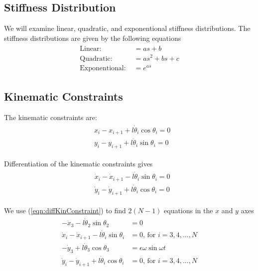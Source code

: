 \documentclass[12pt,letterpaper,titlepage]{article}
\begin{document}
\subsection{Stiffness Distribution}
We will examine linear, quadratic, and exponentional stiffness distributions. The stiffness distributions are given by the following equations
\begin{align}
\begin{split}
\text{Linear: } &= as + b \\
\text{Quadratic: } &= as^2 + bs + c \\
\text{Exponentional: } &= e^{as}
\end{split}
\end{align}

\subsection{Kinematic Constraints}
The kinematic constraints are:
\begin{align}
\begin{split}
& {x}_i - {x}_{i+1} + l \dot{\theta}_i \cos \theta_i = 0 \\
& {y}_i - {y}_{i+1} + l \dot{\theta}_i \sin \theta_i = 0
\end{split}
\end{align}

Differentiation of the kinematic constraints gives
\begin{align} \label{eqn:diffKinConstraint}
\begin{split}
& \dot{x}_i - \dot{x}_{i+1} - l \dot{\theta}_i \sin \theta_i = 0 \\
& \dot{y}_i - \dot{y}_{i+1} + l \dot{\theta}_i \cos \theta_i = 0
\end{split}
\end{align}

We use (\ref{eqn:diffKinConstraint}) to find $2(N-1)$ equations in the $x$ and $y$ axes
\begin{align}
\begin{split}
- \dot{x}_{3} - l \dot{\theta}_2 \sin \theta_2 &= 0\\
\dot{x}_{i} - \dot{x}_{i+1} - l \dot{\theta}_i \sin \theta_i &= 0 \text{, for } i = 3,4,...,N \\
- \dot{y}_{3} + l \dot{\theta}_3 \cos \theta_3 &= \epsilon \omega \sin \omega t \\
\dot{y}_{i} - \dot{y}_{i+1} + l \dot{\theta}_i \cos \theta_i &= 0 \text{, for } i = 3,4,...,N
\end{split}
\end{align}
\end{document}
